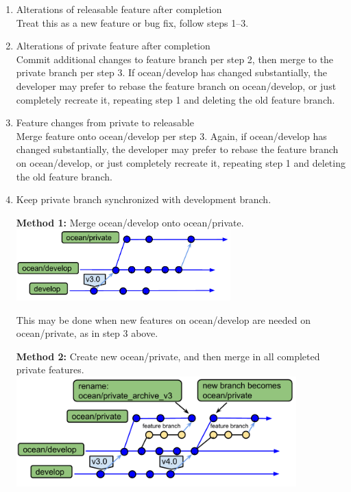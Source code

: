 \documentclass[11pt]{article}
\begin{document}
\begin{enumerate}
\clearpage

\item Alterations of releasable feature after completion\\
Treat this as a new feature or bug fix, follow steps 1--3.

\item Alterations of private feature after completion\\
Commit additional changes to feature branch per step 2, then merge to the private branch per step 3.  If ocean/develop has changed substantially, the developer may prefer to rebase the feature branch on ocean/develop, or just completely recreate it, repeating step 1 and deleting the old feature branch.

\item Feature changes from private to releasable \\
Merge feature onto ocean/develop per step 3.  Again, if ocean/develop has changed substantially, the developer may prefer to rebase the feature branch on ocean/develop, or just completely recreate it, repeating step 1 and deleting the old feature branch.

\item Keep private branch synchronized with development branch.

{\bf Method 1:} Merge ocean/develop onto ocean/private.  \\
\includegraphics[width=3.25in]{f/MPASworkflow_8a.pdf}

This may be done when new features on ocean/develop are needed on ocean/private, as in step 3 above.

{\bf Method 2:} Create new ocean/private, and then merge in all completed private features.  \\
\includegraphics[width=4.25in]{f/MPASworkflow_8b.pdf}


\end{enumerate}
\end{document}
